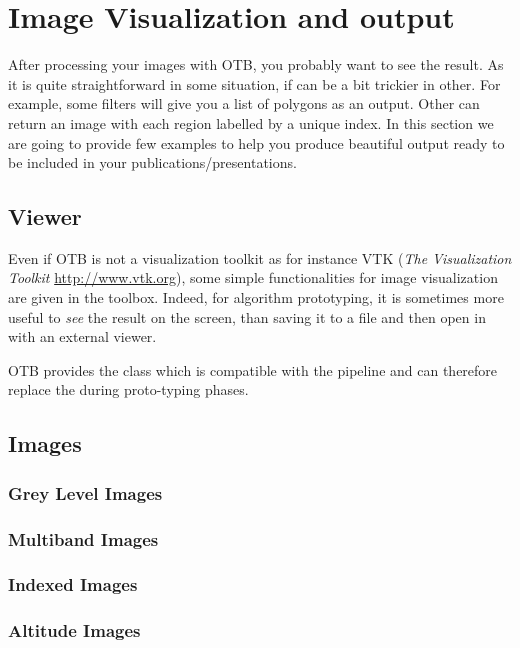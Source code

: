 \chapter{Image Visualization and output}
\label{chap:ImageVisualization}

After processing your images with OTB, you probably want to see the result. As it is quite straightforward in some situation, if can be a bit trickier in other. For example, some filters will give you a list of polygons as an output. Other can return an image with each region labelled by a unique index. In this section we are going to provide few examples to help you produce beautiful output ready to be included in your publications/presentations.


\section{Viewer}
Even if OTB is not a visualization toolkit as for instance VTK
(\emph{The Visualization Toolkit} \url{http://www.vtk.org}), some
simple functionalities for image visualization are given in the
toolbox. Indeed, for algorithm prototyping, it is sometimes more
useful to \emph{see} the result on the screen, than saving it to a
file and then open in with an external viewer.

OTB provides the  class which is compatible
with the pipeline and can therefore replace the
 during proto-typing phases.




\section{Images}

\subsection{Grey Level Images}
\label{sec:ViewingGreyLevelImages}



\subsection{Multiband Images}
\label{sec:ViewingMultibandImages}



\subsection{Indexed Images}
\label{sec:ViewingIndexedImages}



\subsection{Altitude Images}
\label{sec:ViewingAltitudeImages}




